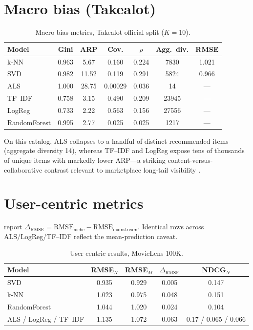 \documentclass[11pt,a4paper,twoside,openright]{report}
\begin{document}
\section{Macro bias (Takealot)}
\begin{table}[htbp]
  \centering
  \caption{Macro-bias metrics, Takealot official split ($K=10$).}
  \label{tab:macrotake}
  \begin{tabular}{lcccccc}
    \toprule
    Model & Gini & ARP & Cov. & $\rho$ & Agg.~div. & RMSE \\
    \midrule
    k-NN & 0.963 & 5.67 & 0.160 & 0.224 & 7830 & 1.021 \\
    SVD & 0.982 & 11.52 & 0.119 & 0.291 & 5824 & 0.966 \\
    ALS & 1.000 & 28.75 & 0.00029 & 0.036 & 14 & --- \\
    TF--IDF & 0.758 & 3.15 & 0.490 & 0.209 & 23945 & --- \\
    LogReg & 0.733 & 2.22 & 0.563 & 0.156 & 27556 & --- \\
    RandomForest & 0.995 & 2.77 & 0.025 & 0.025 & 1217 & --- \\
    \bottomrule
  \end{tabular}
\end{table}
On this catalog, ALS collapses to a handful of distinct recommended items (aggregate diversity 14), whereas TF--IDF and LogReg expose tens of thousands of unique items with markedly lower ARP---a striking content-versus-collaborative contrast relevant to marketplace long-tail visibility \citep{abdollahpouri2020multistakeholder}.

\section{User-centric metrics}
 report $\Delta_{\mathrm{RMSE}} = \mathrm{RMSE}_{\text{niche}} - \mathrm{RMSE}_{\text{mainstream}}$. Identical rows across ALS/LogReg/TF--IDF reflect the mean-prediction caveat.

\begin{table}[htbp]
  \centering
  \caption{User-centric results, MovieLens 100K.}
  \label{tab:fairml100k}
  \begin{tabular}{lcccc}
    \toprule
    Model & RMSE$_N$ & RMSE$_M$ & $\Delta_{\mathrm{RMSE}}$ & NDCG$_N$ \\
    \midrule
    SVD & 0.935 & 0.929 & 0.005 & 0.147 \\
    k-NN & 1.023 & 0.975 & 0.048 & 0.151 \\
    RandomForest & 1.044 & 1.020 & 0.024 & 0.104 \\
    ALS / LogReg / TF--IDF & 1.135 & 1.072 & 0.063 & 0.17 / 0.065 / 0.066 \\
    \bottomrule
  \end{tabular}
\end{table}
\end{document}
